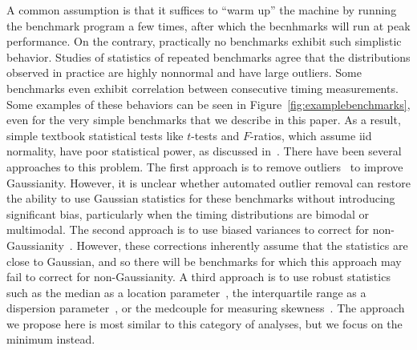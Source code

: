 \documentclass[conference]{IEEEtran}
\begin{document}
A common assumption is that it suffices to ``warm up'' the machine by running
the benchmark program a few times, after which the becnhmarks will run at peak performance.
On the contrary, practically no benchmarks exhibit such simplistic behavior.
Studies of statistics of repeated benchmarks agree that the distributions observed in practice are highly nonnormal and have large outliers. Some benchmarks even exhibit correlation between consecutive
timing measurements.
Some examples of these behaviors can be seen in Figure~\ref{fig:examplebenchmarks},
even for the very simple benchmarks that we describe in this paper.
As a result, simple textbook statistical tests like $t$-tests and $F$-ratios,
which assume iid normality, have poor statistical power, as discussed in~\cite{Mytkowicz2009,Kalibera2013,Chen2015,Barrett2016}.
There have been several approaches to this problem.
The first approach is to remove outliers~\cite{Rehn2015} to improve Gaussianity.
However, it is unclear whether automated outlier removal can restore the ability
to use Gaussian statistics for these benchmarks without introducing significant bias,
particularly when the timing distributions are bimodal or multimodal.
The second approach is to use biased variances to correct for non-Gaussianity~\cite{Mytkowicz2009}.
However, these corrections inherently assume that the statistics are close to Gaussian,
and so there will be benchmarks for which this approach may fail to correct for
non-Gaussianity.
A third approach is to use robust statistics such as the median as a location parameter~\cite{Mytkowicz2009}, the interquartile range as a dispersion parameter~\cite{Mytkowicz2009}, or the medcouple for measuring skewness~\cite{Rehn2015}. The approach we propose here is most similar to this
category of analyses, but we focus on the minimum instead.
\end{document}
